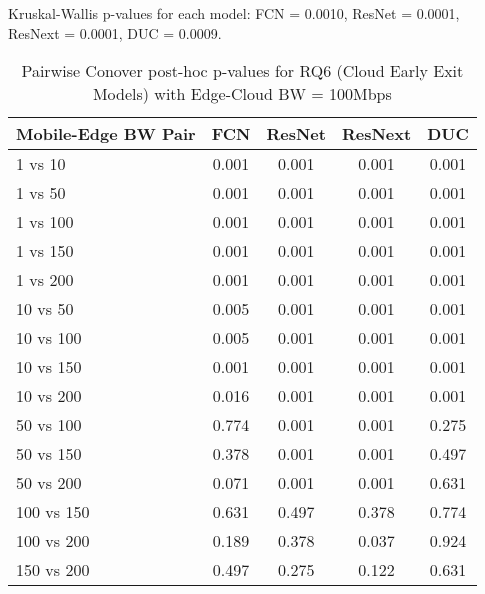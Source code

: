 \begin{table}[h]
\centering
\caption{Pairwise Conover post-hoc p-values for RQ6 (Cloud Early Exit Models) with Edge-Cloud BW = 100Mbps}
\label{tab:conover_cloud_earlyexit_ec100}
\smallskip
Kruskal-Wallis p-values for each model: FCN = 0.0010, ResNet = 0.0001, ResNext = 0.0001, DUC = 0.0009.

\begin{tabular}{lcccc}
\toprule
Mobile-Edge BW Pair & FCN & ResNet & ResNext & DUC \\
\midrule
1 vs 10 & 0.001 & 0.001 & 0.001 & 0.001 \\
1 vs 50 & 0.001 & 0.001 & 0.001 & 0.001 \\
1 vs 100 & 0.001 & 0.001 & 0.001 & 0.001 \\
1 vs 150 & 0.001 & 0.001 & 0.001 & 0.001 \\
1 vs 200 & 0.001 & 0.001 & 0.001 & 0.001 \\
10 vs 50 & 0.005 & 0.001 & 0.001 & 0.001 \\
10 vs 100 & 0.005 & 0.001 & 0.001 & 0.001 \\
10 vs 150 & 0.001 & 0.001 & 0.001 & 0.001 \\
10 vs 200 & 0.016 & 0.001 & 0.001 & 0.001 \\
50 vs 100 & 0.774 & 0.001 & 0.001 & 0.275 \\
50 vs 150 & 0.378 & 0.001 & 0.001 & 0.497 \\
50 vs 200 & 0.071 & 0.001 & 0.001 & 0.631 \\
100 vs 150 & 0.631 & 0.497 & 0.378 & 0.774 \\
100 vs 200 & 0.189 & 0.378 & 0.037 & 0.924 \\
150 vs 200 & 0.497 & 0.275 & 0.122 & 0.631 \\
\bottomrule
\end{tabular}
\end{table}

